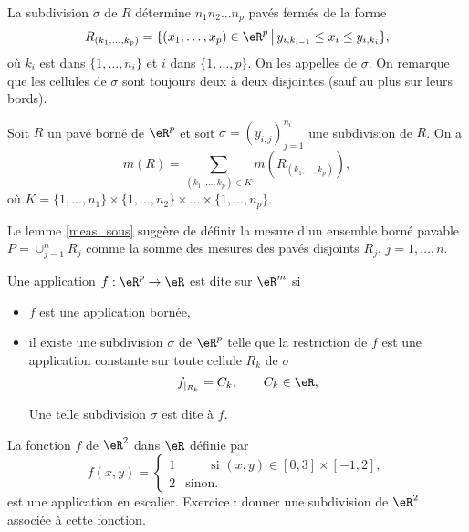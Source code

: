 La subdivision $\sigma$ de $R$ détermine $n_1n_2\ldots n_p$ pavés fermés de la forme 
\[
R_{(k_1,\ldots,k_p)}=\{(x_1,\ldots, x_p)\in\eR^p\,\big\vert\, y_{i,k_{i-1}}\leq x_i\leq y_{i,k_i}\},
\]
où $k_i$ est dans $\{1,\ldots, n_i\}$ et $i$ dans $\{1,\ldots, p\}$. On les appelles  de $\sigma$. On remarque que les cellules de $\sigma$ sont toujours deux à deux disjointes (sauf au plus sur leurs bords). 
\begin{lemma}\label{meas_sous}
	Soit $R$ un pavé borné de $\eR^p$ et soit $\sigma=(y_{i,j})_{j=1}^{n_i}$ une subdivision de $R$. 
On a 
\[
m(R)=\sum_{(k_1,\ldots,k_p)\in K} m(R_{(k_1,\ldots,k_p)}),
\] 
où $K=\{1,\ldots,n_1\}\times\{1,\ldots,n_2\}\times\ldots \times\{1,\ldots,n_p\}$.
\end{lemma}
Le lemme \ref{meas_sous} suggère de définir la mesure d'un ensemble borné pavable $P=\cup_{j=1}^{n}R_j$ comme la somme des mesures des pavés disjoints $R_j$, $j=1,\ldots, n$.
\begin{definition}
Une application $f:\eR^p\to\eR$ est dite  sur $\eR^m$ si
  \begin{itemize}
  \item $f$ est une application bornée,
\item il existe une subdivision $\sigma$ de $\eR^p$ telle que la restriction de $f$  est une application constante sur toute cellule $R_k$ de $\sigma$
\[
f_{\vert_{R_k}}=C_k, \qquad C_k\in\eR,
\]
 
Une telle subdivision $\sigma$ est dite  à $f$. 
  \end{itemize}
\end{definition} 
\begin{example}
  La fonction $f$ de $\eR^2$ dans $\eR$ définie par 
  \begin{equation}
    f(x,y)=\left\{
    \begin{array}{ll}
      1&\qquad \textrm{si } (x,y) \in [0,3]\times[-1,2],\\
2 &\textrm{sinon.} 
    \end{array}\right.
  \end{equation}
est une application en escalier. Exercice : donner une subdivision de $\eR^2$ associée à cette fonction.
\end{example}

